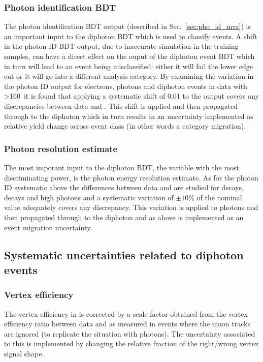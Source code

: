 \subsubsection{Photon identification BDT}

The photon identification BDT output (described in Sec.~\ref{sec:pho_id_mva}) is an important input to the diphoton BDT which is used to classify events. A shift in the photon ID BDT output, due to inaccurate simulation in the training samples, can have a direct effect on the ouput of the diphoton event BDT which in turn will lead to an event being misclassified; either it will fail the lower edge cut or it will go into a different analysis category. By examining the variation in the photon ID output for \Zee electrons, \Zmumugamma photons and diphoton events in data with \mgg>160~\GeV it is found that applying a systematic shift of 0.01 to the output covers any discrepancies between data and \MC. This shift is applied and then propagated through to the diphoton \BDT which in turn results in an uncertainty implemented as relative yield change across event class (in other words a category migration).

\subsubsection{Photon resolution estimate}

The most imporant input to the diphoton BDT, the variable with the most discriminating power, is the photon energy resolution estimate. As for the photon ID systematic above the differences between data and \MC are studied for \Zee decays, \Zmumugamma decays and high \pT photons and a systematic variation of $\pm10$\% of the nominal value adequately covers any discrepancy. This variation is applied to photons and then propagated through to the diphoton \BDT and as above is implemented as an event migration uncertainty.

\subsection{Systematic uncertainties related to diphoton events}

\subsubsection{Vertex efficiency}

The vertex efficiency in \MC is corrected by a scale factor obtained from the vertex efficiency ratio between data and \MC as measured in \Zmumu events where the muon tracks are ignored (to replicate the situation with photons). The uncertainty associated to this is implemented by changing the relative fraction of the right/wrong vertex signal shape. 

